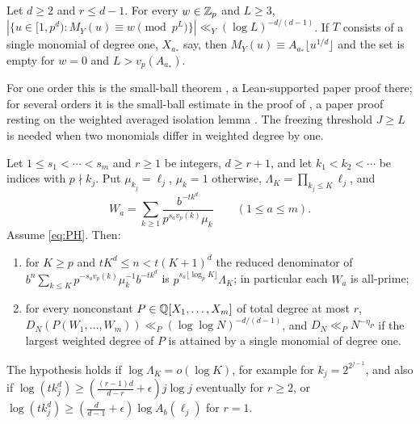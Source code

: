 \documentclass[11pt]{article}
\begin{document}
\begin{theorem}\label{thm:wsmallball}
Let $d\ge2$ and $r\le d-1$. For every $w\in\mathbb Z_p$ and $L\ge3$,
$|\{u\in[1,p^d):M_Y(u)\equiv w\pmod{p^L}\}|\ll_Y(\log L)^{-d/(d-1)}$. If $T$ consists of a single monomial of degree one,
$X_{a_*}$ say, then $M_Y(u)\equiv A_{a_*}\lfloor u^{1/d}\rfloor$ and the set is empty for $w=0$ and $L>v_p(A_{a_*})$.
\end{theorem}

For one order this is the small-ball theorem \cite[Theorem~7.18]{PaperVIIv2}, a Lean-supported paper proof there; for
several orders it is the small-ball estimate in the proof of \cite[Theorem~7.24]{PaperVIIv2}, a paper proof resting on
the weighted averaged isolation lemma \cite[Lemma~7.23]{PaperVIIv2}. The freezing threshold $J\ge L$ is needed when two
monomials differ in weighted degree by one.

\begin{theorem}\label{thm:hybrid}
Let $1\le s_1<\cdots<s_m$ and $r\ge1$ be integers, $d\ge r+1$, and let $k_1<k_2<\cdots$ be indices with $p\nmid k_j$. Put
$\mu_{k_j}=\ell_j$, $\mu_k=1$ otherwise, $\Lambda_K=\prod_{k_j\le K}\ell_j$, and
\[
W_a=\sum_{k\ge1}\frac{b^{-tk^d}}{p^{s_av_p(k)}\mu_k}\qquad(1\le a\le m).
\]
Assume \eqref{eq:PH}. Then:
\begin{enumerate}[label=\textup{(\roman*)},nosep]
\item for $K\ge p$ and $tK^d\le n<t(K+1)^d$ the reduced denominator of $b^n\sum_{k\le K}p^{-s_av_p(k)}\mu_k^{-1}b^{-tk^d}$ is
$p^{s_a\lfloor\log_pK\rfloor}\Lambda_K$; in particular each $W_a$ is all-prime;
\item for every nonconstant $P\in\mathbb Q[X_1,\ldots,X_m]$ of total degree at most $r$,
$D_N(P(W_1,\ldots,W_m))\ll_P(\log\log N)^{-d/(d-1)}$, and $D_N\ll_PN^{-\eta_P}$ if the largest weighted degree of $P$ is attained by
a single monomial of degree one.
\end{enumerate}
The hypothesis holds if $\log\Lambda_K=o(\log K)$, for example for $k_j=2^{2^{j-1}}$, and also if
$\log(tk_j^d)\ge(\frac{(r-1)d}{d-r}+\epsilon)j\log j$ eventually for $r\ge2$, or $\log(tk_j^d)\ge(\frac d{d-1}+\epsilon)\log A_b(\ell_j)$ for
$r=1$.
\end{theorem}
\end{document}
